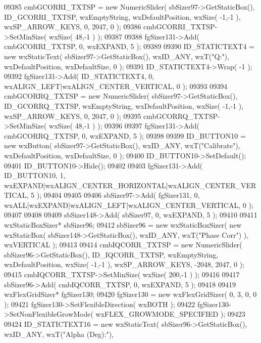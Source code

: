 \begin{DoxyCode}
09385     cmbGCORRI_TXTSP = \textcolor{keyword}{new} NumericSlider( sbSizer97->GetStaticBox(), 
      ID_GCORRI_TXTSP, wxEmptyString, wxDefaultPosition, wxSize( -1,-1 ), wxSP\_ARROW\_KEYS, 0, 2047, 0 );
09386     cmbGCORRI_TXTSP->SetMinSize( wxSize( 48,-1 ) );
09387     
09388     fgSizer131->Add( cmbGCORRI_TXTSP, 0, wxEXPAND, 5 );
09389     
09390     ID_STATICTEXT4 = \textcolor{keyword}{new} wxStaticText( sbSizer97->GetStaticBox(), wxID\_ANY, wxT(\textcolor{stringliteral}{"Q:"}), wxDefaultPosition, 
      wxDefaultSize, 0 );
09391     ID_STATICTEXT4->Wrap( -1 );
09392     fgSizer131->Add( ID_STATICTEXT4, 0, wxALIGN\_LEFT|wxALIGN\_CENTER\_VERTICAL, 0 );
09393     
09394     cmbGCORRQ_TXTSP = \textcolor{keyword}{new} NumericSlider( sbSizer97->GetStaticBox(), 
      ID_GCORRQ_TXTSP, wxEmptyString, wxDefaultPosition, wxSize( -1,-1 ), wxSP\_ARROW\_KEYS, 0, 2047, 0 );
09395     cmbGCORRQ_TXTSP->SetMinSize( wxSize( 48,-1 ) );
09396     
09397     fgSizer131->Add( cmbGCORRQ_TXTSP, 0, wxEXPAND, 5 );
09398     
09399     ID_BUTTON10 = \textcolor{keyword}{new} wxButton( sbSizer97->GetStaticBox(), wxID\_ANY, wxT(\textcolor{stringliteral}{"Calibrate"}), wxDefaultPosition, 
      wxDefaultSize, 0 );
09400     ID_BUTTON10->SetDefault(); 
09401     ID_BUTTON10->Hide();
09402     
09403     fgSizer131->Add( ID_BUTTON10, 1, wxEXPAND|wxALIGN\_CENTER\_HORIZONTAL|wxALIGN\_CENTER\_VERTICAL, 5 );
09404     
09405     
09406     sbSizer97->Add( fgSizer131, 0, wxALL|wxEXPAND|wxALIGN\_LEFT|wxALIGN\_CENTER\_VERTICAL, 0 );
09407     
09408     
09409     sbSizer148->Add( sbSizer97, 0, wxEXPAND, 5 );
09410     
09411     wxStaticBoxSizer* sbSizer96;
09412     sbSizer96 = \textcolor{keyword}{new} wxStaticBoxSizer( \textcolor{keyword}{new} wxStaticBox( sbSizer148->GetStaticBox(), wxID\_ANY, wxT(\textcolor{stringliteral}{"Phase
       Corr"}) ), wxVERTICAL );
09413     
09414     cmbIQCORR_TXTSP = \textcolor{keyword}{new} NumericSlider( sbSizer96->GetStaticBox(), 
      ID_IQCORR_TXTSP, wxEmptyString, wxDefaultPosition, wxSize( -1,-1 ), wxSP\_ARROW\_KEYS, -2048, 2047, 0 );
09415     cmbIQCORR_TXTSP->SetMinSize( wxSize( 200,-1 ) );
09416     
09417     sbSizer96->Add( cmbIQCORR_TXTSP, 0, wxEXPAND, 5 );
09418     
09419     wxFlexGridSizer* fgSizer130;
09420     fgSizer130 = \textcolor{keyword}{new} wxFlexGridSizer( 0, 3, 0, 0 );
09421     fgSizer130->SetFlexibleDirection( wxBOTH );
09422     fgSizer130->SetNonFlexibleGrowMode( wxFLEX\_GROWMODE\_SPECIFIED );
09423     
09424     ID_STATICTEXT16 = \textcolor{keyword}{new} wxStaticText( sbSizer96->GetStaticBox(), wxID\_ANY, wxT(\textcolor{stringliteral}{"Alpha (Deg):"}), 

\end{DoxyCode}
